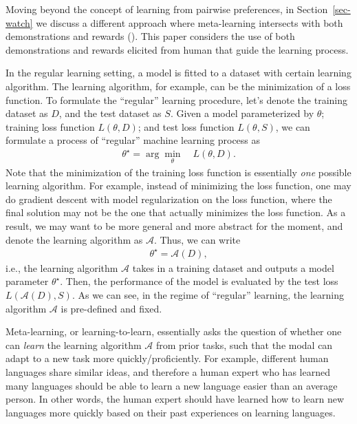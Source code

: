 \documentclass[
  letterpaper,
  numbers=noenddot,
  DIV=11]{scrreprt}
\theoremstyle{definition}
\theoremstyle{plain}
\theoremstyle{plain}
\theoremstyle{remark}
\begin{document}
Moving beyond the concept of learning from pairwise preferences, in
Section~\ref{sec-watch} we discuss a different approach where
meta-learning intersects with both demonstrations and rewards
(). This paper considers
the use of both demonstrations and rewards elicited from human that
guide the learning process.

In the regular learning setting, a model is fitted to a dataset with
certain learning algorithm. The learning algorithm, for example, can be
the minimization of a loss function. To formulate the ``regular''
learning procedure, let's denote the training dataset as \(D\), and the
test dataset as \(S\). Given a model parameterized by \(\theta\);
training loss function \(L(\theta, D)\); and test loss function
\(L(\theta, S)\), we can formulate a process of ``regular'' machine
learning process as \[\begin{aligned}
    \theta^\star = \arg\min_\theta\quad L(\theta, D).
\end{aligned}\] Note that the minimization of the training loss function
is essentially \emph{one} possible learning algorithm. For example,
instead of minimizing the loss function, one may do gradient descent
with model regularization on the loss function, where the final solution
may not be the one that actually minimizes the loss function. As a
result, we may want to be more general and more abstract for the moment,
and denote the learning algorithm as \(\mathcal{A}\). Thus, we can write
\[\begin{aligned}
    \theta^\star = \mathcal{A}(D),
\end{aligned}\] i.e., the learning algorithm \(\mathcal{A}\) takes in a
training dataset and outputs a model parameter \(\theta^\star\). Then,
the performance of the model is evaluated by the test loss
\(L(\mathcal{A}(D), S)\). As we can see, in the regime of ``regular''
learning, the learning algorithm \(\mathcal{A}\) is pre-defined and
fixed.

Meta-learning, or learning-to-learn, essentially asks the question of
whether one can \emph{learn} the learning algorithm \(\mathcal{A}\) from
prior tasks, such that the modal can adapt to a new task more
quickly/proficiently. For example, different human languages share
similar ideas, and therefore a human expert who has learned many
languages should be able to learn a new language easier than an average
person. In other words, the human expert should have learned how to
learn new languages more quickly based on their past experiences on
learning languages.
\end{document}
